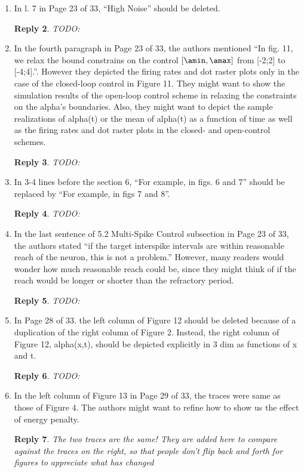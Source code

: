 \documentclass{article}
\newtheorem*{rep}{Reply}
\begin{document}
\begin{enumerate}
\begin{rep}
\end{rep}

\item In l. 7 in Page 23 of 33, “High Noise” should be deleted.
\begin{rep}
TODO:
\end{rep}

\item In the fourth paragraph in Page 23 of 33, the authors mentioned “In fig. 11,
we relax the bound constrains on the control $[\amin, \amax]$ from
[-2;2] to [-4;4].”. However they depicted the firing rates and dot raster plots only in
the case of the closed-loop control in Figure 11. They might want to show the
simulation results of the open-loop control scheme in relaxing the constraints
on the alpha's boundaries. Also, they might want to depict the sample
realizations of alpha(t) or the mean of alpha(t) as a function of time as well
as the firing rates and dot raster plots in the closed- and open-control
schemes.
\begin{rep}
TODO:
\end{rep}

\item In 3-4 lines before the section 6, “For example, in figs. 6 and 7” should be
replaced by “For example, in figs 7 and 8”.
\begin{rep}
TODO:
\end{rep}

\item In the last sentence of 5.2 Multi-Spike Control subsection in Page 23 of 33,
the authors stated “if the target interspike intervals are within reasonable
reach of the neuron, this is not a problem.” However, many readers would wonder
how much reasonable reach could be, since they might think of if the reach would
be longer or shorter than the refractory period.
\begin{rep}
TODO:
\end{rep}
\item In Page 28 of 33. the left column of Figure 12 should be deleted because
of a duplication of the right column of Figure 2. Instead, the right column of Figure
12, alpha(x,t), should be depicted explicitly in 3 dim as functions of x and t.
\begin{rep}
TODO:
\end{rep}

\item In the left column of Figure 13 in Page 29 of 33, the traces were same as
those of Figure 4. The authors might want to refine how to show us the effect of
energy penalty.
\begin{rep}
The two traces are the same! They are added here to compare against
the traces on the right, so that people don't flip back and forth for figures to
appreciate what has changed
\end{rep}


\end{enumerate}
\end{document}
